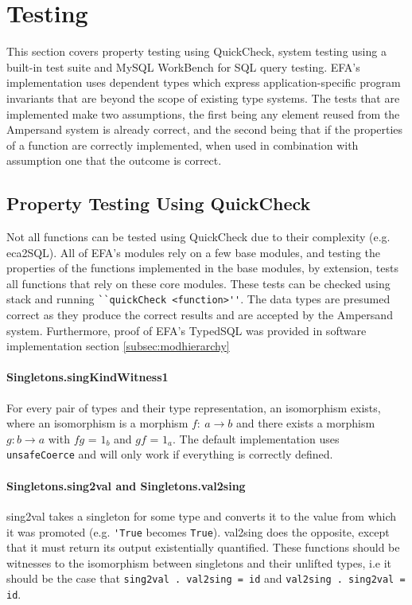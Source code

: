\chapter{Testing}

This section covers property testing using QuickCheck, system testing using a 
built-in test suite and MySQL WorkBench for SQL query testing. EFA's 
implementation uses dependent types which express application-specific program 
invariants that are beyond the scope of existing type systems. The tests that 
are implemented make two assumptions, the first being any element reused from 
the Ampersand system is already correct, and the second being that if the 
properties of a function are correctly implemented, when used in combination 
with assumption one that the outcome is correct.

\section{Property Testing Using QuickCheck}
Not all functions can be tested using QuickCheck due to their complexity (e.g. 
eca2SQL). All of EFA's modules rely on a few base modules, and testing the 
properties of the functions implemented in the base modules, by extension, 
tests all functions that rely on these core modules. These tests can be checked 
using stack and running \verb|``quickCheck <function>''|. The data types are 
presumed correct as they produce the correct results and are accepted by the 
Ampersand system. Furthermore, proof of EFA's TypedSQL was provided in software 
implementation section \ref{subsec:modhierarchy}

\subsubsection*{Singletons.singKindWitness1}
For every pair of types and their type representation, an isomorphism exists,
where an isomorphism is a morphism $f:\ a \rightarrow b$ and there exists a
morphism $g: b \rightarrow a$ with $fg$ = $1_b$ and $gf$ = $1_a$. The default
implementation uses \lstinline{unsafeCoerce} and will only work if everything
is correctly defined.
         

\subsubsection*{Singletons.sing2val and Singletons.val2sing}
sing2val takes a singleton for some type and converts it to the value
from which it was promoted (e.g. \lstinline{'True} becomes \lstinline{True}).
val2sing does the opposite, except that it must return its output 
existentially quantified. These functions should be witnesses to the isomorphism
between singletons and their unlifted types, i.e it should be the case
that \lstinline{sing2val . val2sing = id} and \lstinline{val2sing . sing2val = id}. 


